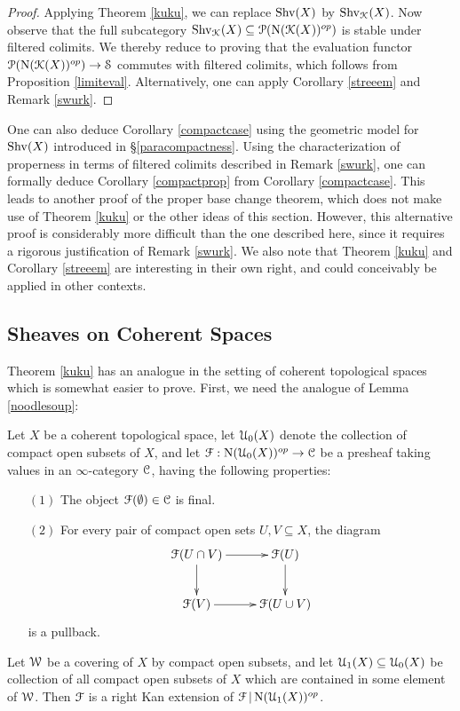 \begin{proof}
Applying Theorem \ref{kuku}, we can replace $\operatorname{Shv}(X)$ by $\operatorname{Shv}_{\operatorname{\mathcal{K}}}(X)$. Now observe that the full subcategory $\operatorname{Shv}_{\operatorname{\mathcal{K}}}(X) \subseteq \operatorname{\mathcal{P}}( \operatorname{N}(\operatorname{\mathcal{K}}(X))^{op})$ is stable under filtered colimits. We thereby reduce to proving that the evaluation functor $\operatorname{\mathcal{P}}( \operatorname{N}(\operatorname{\mathcal{K}}(X))^{op} ) \rightarrow \operatorname{\mathcal{S}}$ commutes with filtered colimits, which follows from Proposition \ref{limiteval}.
Alternatively, one can apply Corollary \ref{streeem} and Remark \ref{swurk}.
\end{proof}

\begin{remark}
One can also deduce Corollary \ref{compactcase} using the geometric model for $\operatorname{Shv}(X)$ introduced in \S \ref{paracompactness}. Using the characterization of properness in terms of filtered colimits described in Remark \ref{swurk}, one can formally deduce Corollary \ref{compactprop} from
Corollary \ref{compactcase}. This leads to another proof of the proper base change theorem, which does not make use of Theorem \ref{kuku} or the other ideas of this section. However, this alternative proof is considerably more difficult than the one described here, since it requires a rigorous justification of Remark \ref{swurk}. We also note that Theorem \ref{kuku} and Corollary \ref{streeem} are interesting in their own right, and could conceivably be applied in other contexts.
\end{remark}

\subsection{Sheaves on Coherent Spaces}\label{cohthm}

Theorem \ref{kuku} has an analogue in the setting of coherent topological spaces which is somewhat easier to prove. First, we need the analogue of Lemma \ref{noodlesoup}:

\begin{lemma}\label{oldtime}
Let $X$ be a coherent topological space, let $\operatorname{\mathcal{U}}_0(X)$ denote the collection
of compact open subsets of $X$, and let $\operatorname{\mathcal{F}}: \operatorname{N}(\operatorname{\mathcal{U}}_0(X))^{op} \rightarrow \operatorname{\mathcal{C}}$
be a presheaf taking values in an $\infty$-category $\operatorname{\mathcal{C}}$, having the following properties:
\begin{itemize}
\item[$(1)$] The object $\operatorname{\mathcal{F}}(\emptyset) \in \operatorname{\mathcal{C}}$ is final.
\item[$(2)$] For every pair of compact open sets $U, V \subseteq X$, the diagram
$$ \xymatrix{ \calF( U \cap V) \ar[r] \ar[d] & \calF(U) \ar[d] \\
\calF(V) \ar[r] & \calF(U \cup V) }$$
is a pullback.
\end{itemize}
Let $\operatorname{\mathcal{W}}$ be a covering of $X$ by compact open subsets, and let $\operatorname{\mathcal{U}}_{1}(X) \subseteq \operatorname{\mathcal{U}}_{0}(X)$ be collection of all compact open subsets of $X$ which are contained in some element of $\operatorname{\mathcal{W}}$. Then $\operatorname{\mathcal{F}}$ is a right Kan extension of $\operatorname{\mathcal{F}} | \operatorname{N}(\operatorname{\mathcal{U}}_1(X))^{op}$. 
\end{lemma}

